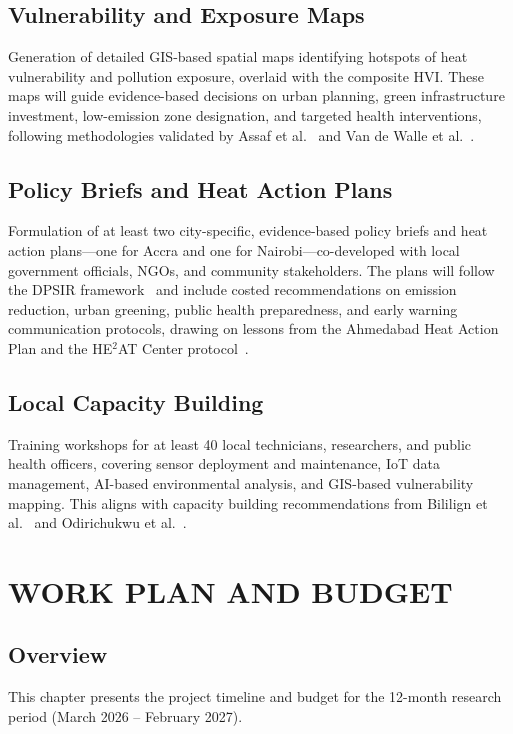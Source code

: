 \documentclass[12pt,a4paper]{report}
\begin{document}
\section{Vulnerability and Exposure Maps}
Generation of detailed GIS-based spatial maps identifying hotspots of heat vulnerability and pollution exposure, overlaid with the composite HVI. These maps will guide evidence-based decisions on urban planning, green infrastructure investment, low-emission zone designation, and targeted health interventions, following methodologies validated by Assaf et al.~\cite{assaf2023} and Van de Walle et al.~\cite{vandewalle2021}.

\section{Policy Briefs and Heat Action Plans}
Formulation of at least two city-specific, evidence-based policy briefs and heat action plans—one for Accra and one for Nairobi—co-developed with local government officials, NGOs, and community stakeholders. The plans will follow the DPSIR framework~\cite{tetali2025} and include costed recommendations on emission reduction, urban greening, public health preparedness, and early warning communication protocols, drawing on lessons from the Ahmedabad Heat Action Plan and the HE$^2$AT Center protocol~\cite{Christopher_Jack_2024}.

\section{Local Capacity Building}
Training workshops for at least 40 local technicians, researchers, and public health officers, covering sensor deployment and maintenance, IoT data management, AI-based environmental analysis, and GIS-based vulnerability mapping. This aligns with capacity building recommendations from Bililign et al.~\cite{Solomon_Bililign_2024} and Odirichukwu et al.~\cite{JC_Odirichukwu_2024}.

\chapter{WORK PLAN AND BUDGET}

\section{Overview}
This chapter presents the project timeline and budget for the 12-month research period (March 2026 -- February 2027).
\end{document}
